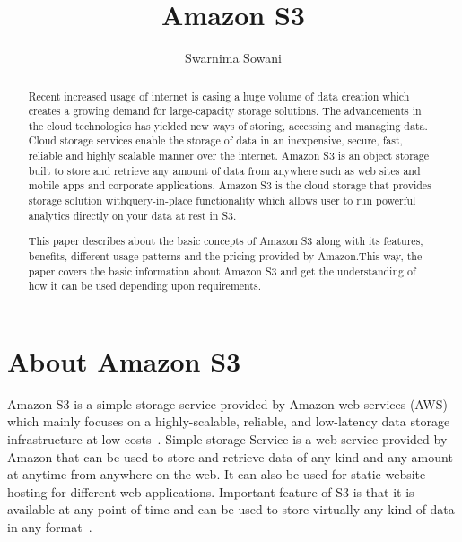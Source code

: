 
\title{Amazon S3}


\author{Swarnima Sowani}


\renewcommand{\shortauthors}{G. v. Laszewski}

\begin{abstract}

Recent increased usage of internet is casing a huge volume of data creation
which creates a growing demand for large-capacity storage solutions. The
advancements in the cloud technologies has yielded new ways of storing,
accessing and managing data. Cloud storage services enable the storage of data
in an inexpensive, secure, fast, reliable and highly scalable manner over the
internet. Amazon S3 is an object storage built to store and retrieve any amount
of data from anywhere such as web sites and mobile apps and corporate
applications. Amazon S3 is the cloud storage that provides storage solution
withquery-in-place functionality which allows user to run powerful analytics
directly on your data at rest in S3.

This paper describes about the basic concepts of Amazon S3 along with its
features, benefits, different usage patterns and the pricing provided by
Amazon.This way, the paper covers the basic information about Amazon S3 and get
the
understanding of how it can be used depending upon requirements.
\end{abstract}


\maketitle

\section{About Amazon S3}

Amazon S3 is a simple storage service provided by Amazon web services (AWS)
which mainly focuses on a highly-scalable, reliable, and low-latency data
storage infrastructure at low costs~\cite{hid-sp18-420-amazon-S3-FAQ}. Simple
storage Service is a web service provided by Amazon that can be used to store
and retrieve data of any kind and any amount at anytime from anywhere on the
web. It can also be used for static website hosting for different web
applications. Important feature of S3 is that it is available at any point of
time and can be used to store virtually any kind of data in any
format~\cite{hid-sp18-420-amazon-S3-FAQ}.

